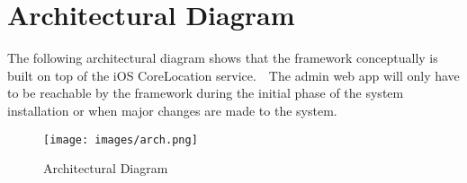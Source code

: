 \chapter{Architectural Diagram}
The following architectural diagram shows that the framework conceptually is built on top of the iOS CoreLocation service.  The admin web app will only have to be reachable by the framework during the initial phase of the system installation or when major changes are made to the system.
\begin{figure}[h]
\texttt{[image: images/arch.png]}
\caption{Architectural Diagram}
\end{figure}
